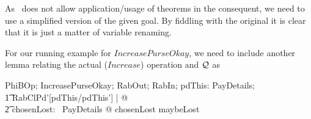 
As \zeves\ does not allow application/usage of theorems in the consequent,
we need to use a simplified version of the given goal. By fiddling with the
original it is clear that it is just a matter of variable renaming.

For our running example for $IncreasePurseOkay$, we need to include another lemma
relating the actual ($Increase$) operation and $\mathcal{Q}$ as
%
\begin{gzed}
    \forall PhiBOp; IncreasePurseOkay; RabOut; RabIn; pdThis: PayDetails; \\
        \t1 RabClPd'[pdThis/pdThis'] | \pdThisPred @ \\
            \t2 \exists chosenLost: \power~PayDetails @ \chosenLostPred \land chosenLost \subseteq maybeLost
\end{gzed}
%


